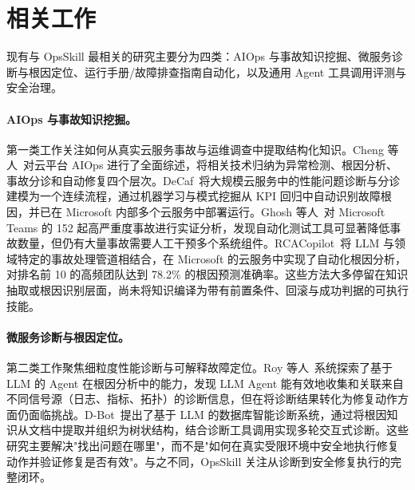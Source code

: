 \documentclass[11pt,a4paper]{ctexart}
\begin{document}
\section{相关工作}

现有与 OpsSkill 最相关的研究主要分为四类：AIOps 与事故知识挖掘、微服务诊断与根因定位、运行手册/故障排查指南自动化，以及通用 Agent 工具调用评测与安全治理。

\paragraph{AIOps 与事故知识挖掘。}
第一类工作关注如何从真实云服务事故与运维调查中提取结构化知识。Cheng 等人~\cite{cheng2023aiops}对云平台 AIOps 进行了全面综述，将相关技术归纳为异常检测、根因分析、事故分诊和自动修复四个层次。DeCaf~\cite{bansal2020decaf}将大规模云服务中的性能问题诊断与分诊建模为一个连续流程，通过机器学习与模式挖掘从 KPI 回归中自动识别故障根因，并已在 Microsoft 内部多个云服务中部署运行。Ghosh 等人~\cite{ghosh2022incidents}对 Microsoft Teams 的 152 起高严重度事故进行实证分析，发现自动化测试工具可显著降低事故数量，但仍有大量事故需要人工干预多个系统组件。RCACopilot~\cite{chen2024rcacopilot}将 LLM 与领域特定的事故处理管道相结合，在 Microsoft 的云服务中实现了自动化根因分析，对排名前 10 的高频团队达到 78.2\% 的根因预测准确率。这些方法大多停留在知识抽取或根因识别层面，尚未将知识编译为带有前置条件、回滚与成功判据的可执行技能。

\paragraph{微服务诊断与根因定位。}
第二类工作聚焦细粒度性能诊断与可解释故障定位。Roy 等人~\cite{roy2024rca_agents}系统探索了基于 LLM 的 Agent 在根因分析中的能力，发现 LLM Agent 能有效地收集和关联来自不同信号源（日志、指标、拓扑）的诊断信息，但在将诊断结果转化为修复动作方面仍面临挑战。D-Bot~\cite{zhou2023dbot}提出了基于 LLM 的数据库智能诊断系统，通过将根因知识从文档中提取并组织为树状结构，结合诊断工具调用实现多轮交互式诊断。这些研究主要解决"找出问题在哪里"，而不是"如何在真实受限环境中安全地执行修复动作并验证修复是否有效"。与之不同，OpsSkill 关注从诊断到安全修复执行的完整闭环。
\end{document}
